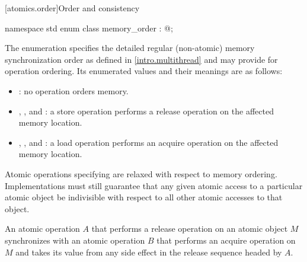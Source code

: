 [atomics.order]{Order and consistency}
%
%
%
%
%
%
%
%
%
%
%

\begin{codeblock}
namespace std {
  enum class memory_order : @;
}
\end{codeblock}

\pnum
The enumeration  specifies the detailed regular
(non-atomic) memory synchronization order as defined in
\ref{intro.multithread} and may provide for operation ordering. Its
enumerated values and their meanings are as follows:

\begin{itemize}
\item {}: no operation orders memory.

\item {}, , and
: a store operation performs a release operation on the
affected memory location.

\item {}, , and
: a load operation performs an acquire operation on the
affected memory location.
\end{itemize}

\begin{note}
Atomic operations specifying  are relaxed
with respect to memory ordering. Implementations must still guarantee that any
given atomic access to a particular atomic object be indivisible with respect
to all other atomic accesses to that object.
\end{note}

\pnum
An atomic operation $A$ that performs a release operation on an atomic
object $M$ synchronizes with an atomic operation $B$ that performs
an acquire operation on $M$ and takes its value from any side effect in the
release sequence headed by $A$.

